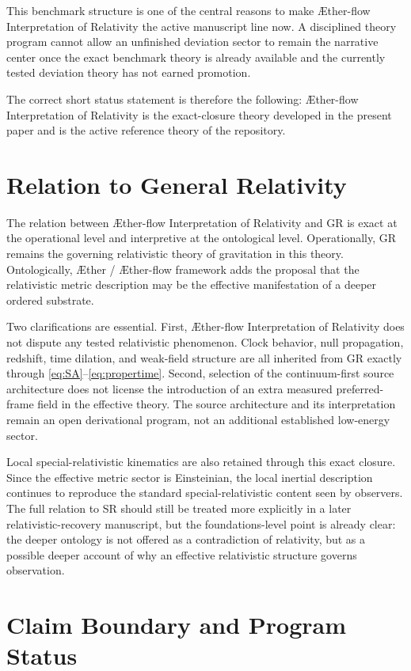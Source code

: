 \documentclass[11pt]{article}
\newcommand{\Aether}{\AE{}ther}
\newcommand{\Aflow}{\AE{}ther-flow}
\newcommand{\TheoryName}{\Aflow{} Interpretation of Relativity}
\newcommand{\TheoryProgram}{\Aether{} / \Aflow{} framework}
\begin{document}
This benchmark structure is one of the central reasons to make \TheoryName{} the active manuscript line now. A disciplined theory program cannot allow an unfinished deviation sector to remain the narrative center once the exact benchmark theory is already available and the currently tested deviation theory has not earned promotion.

The correct short status statement is therefore the following: \TheoryName{} is the exact-closure theory developed in the present paper and is the active reference theory of the repository.

\section{Relation to General Relativity}

The relation between \TheoryName{} and GR is exact at the operational level and interpretive at the ontological level. Operationally, GR remains the governing relativistic theory of gravitation in this theory. Ontologically, \TheoryProgram{} adds the proposal that the relativistic metric description may be the effective manifestation of a deeper ordered substrate.

Two clarifications are essential. First, \TheoryName{} does not dispute any tested relativistic phenomenon. Clock behavior, null propagation, redshift, time dilation, and weak-field structure are all inherited from GR exactly through \eqref{eq:SA}--\eqref{eq:propertime}. Second, selection of the continuum-first source architecture does not license the introduction of an extra measured preferred-frame field in the effective theory. The source architecture and its interpretation remain an open derivational program, not an additional established low-energy sector.

Local special-relativistic kinematics are also retained through this exact closure. Since the effective metric sector is Einsteinian, the local inertial description continues to reproduce the standard special-relativistic content seen by observers. The full relation to SR should still be treated more explicitly in a later relativistic-recovery manuscript, but the foundations-level point is already clear: the deeper ontology is not offered as a contradiction of relativity, but as a possible deeper account of why an effective relativistic structure governs observation.

\section{Claim Boundary and Program Status}
\end{document}
